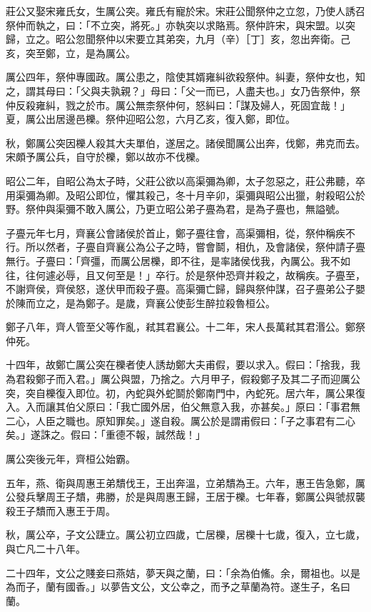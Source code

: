 \begin{pinyinscope}
莊公又娶宋雍氏女，生厲公突。雍氏有寵於宋。宋莊公聞祭仲之立忽，乃使人誘召祭仲而執之，曰：「不立突，將死。」亦執突以求賂焉。祭仲許宋，與宋盟。以突歸，立之。昭公忽聞祭仲以宋要立其弟突，九月（辛）［丁］亥，忽出奔衛。己亥，突至鄭，立，是為厲公。

厲公四年，祭仲專國政。厲公患之，陰使其婿雍糾欲殺祭仲。糾妻，祭仲女也，知之，謂其母曰：「父與夫孰親？」母曰：「父一而已，人盡夫也。」女乃告祭仲，祭仲反殺雍糾，戮之於市。厲公無柰祭仲何，怒糾曰：「謀及婦人，死固宜哉！」夏，厲公出居邊邑櫟。祭仲迎昭公忽，六月乙亥，復入鄭，即位。

秋，鄭厲公突因櫟人殺其大夫單伯，遂居之。諸侯聞厲公出奔，伐鄭，弗克而去。宋頗予厲公兵，自守於櫟，鄭以故亦不伐櫟。

昭公二年，自昭公為太子時，父莊公欲以高渠彌為卿，太子忽惡之，莊公弗聽，卒用渠彌為卿。及昭公即位，懼其殺己，冬十月辛卯，渠彌與昭公出獵，射殺昭公於野。祭仲與渠彌不敢入厲公，乃更立昭公弟子亹為君，是為子亹也，無謚號。

子亹元年七月，齊襄公會諸侯於首止，鄭子亹往會，高渠彌相，從，祭仲稱疾不行。所以然者，子亹自齊襄公為公子之時，嘗會鬬，相仇，及會諸侯，祭仲請子亹無行。子亹曰：「齊彊，而厲公居櫟，即不往，是率諸侯伐我，內厲公。我不如往，往何遽必辱，且又何至是！」卒行。於是祭仲恐齊并殺之，故稱疾。子亹至，不謝齊侯，齊侯怒，遂伏甲而殺子亹。高渠彌亡歸，歸與祭仲謀，召子亹弟公子嬰於陳而立之，是為鄭子。是歲，齊襄公使彭生醉拉殺魯桓公。

鄭子八年，齊人管至父等作亂，弒其君襄公。十二年，宋人長萬弒其君湣公。鄭祭仲死。

十四年，故鄭亡厲公突在櫟者使人誘劫鄭大夫甫假，要以求入。假曰：「捨我，我為君殺鄭子而入君。」厲公與盟，乃捨之。六月甲子，假殺鄭子及其二子而迎厲公突，突自櫟復入即位。初，內蛇與外蛇鬬於鄭南門中，內蛇死。居六年，厲公果復入。入而讓其伯父原曰：「我亡國外居，伯父無意入我，亦甚矣。」原曰：「事君無二心，人臣之職也。原知罪矣。」遂自殺。厲公於是謂甫假曰：「子之事君有二心矣。」遂誅之。假曰：「重德不報，誠然哉！」

厲公突後元年，齊桓公始霸。

五年，燕、衛與周惠王弟穨伐王，王出奔溫，立弟穨為王。六年，惠王告急鄭，厲公發兵擊周王子穨，弗勝，於是與周惠王歸，王居于櫟。七年春，鄭厲公與虢叔襲殺王子穨而入惠王于周。

秋，厲公卒，子文公踕立。厲公初立四歲，亡居櫟，居櫟十七歲，復入，立七歲，與亡凡二十八年。

二十四年，文公之賤妾曰燕姞，夢天與之蘭，曰：「余為伯鯈。余，爾祖也。以是為而子，蘭有國香。」以夢告文公，文公幸之，而予之草蘭為符。遂生子，名曰蘭。


\end{pinyinscope}
